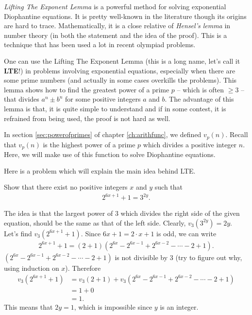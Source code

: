 \documentclass[main.tex]{subfile}
\begin{document}
\textit{Lifting The Exponent Lemma} is a powerful method for solving exponential Diophantine equations. It is pretty well-known in the literature though its origins are hard to trace. Mathematically, it is a close relative of \textit{Hensel's lemma} in number theory (in both the statement and the idea of the proof). This is a technique that has been used a lot in recent olympiad problems.

One can use the Lifting The Exponent Lemma (this is a long name, let's call it \textbf{LTE}!) in problems involving exponential equations, especially when there are some prime numbers (and actually in some cases overkills the problems). This lemma shows how to find the greatest power of a prime $p$ -- which is often $\geq 3$ -- that divides $a^n \pm b^n$ for some positive integers $a$ and $b$. The advantage of this lemma is that, it is quite simple to understand and if in some contest, it is refrained from being used, the proof is not hard as well.


In section \eqref{sec:powerofprimes} of chapter \eqref{ch:arithfunc}, we defined $v_p(n)$. Recall that $v_p(n)$ is the highest power of a prime $p$ which divides a positive integer $n$. Here, we will make use of this function to solve Diophantine equations.

Here is a problem which will explain the main idea behind LTE.

    \begin{problem}
    	Show that there exist no positive integers $x$ and $y$ such that
    	\begin{align*}
    		2^{6x+1} + 1 = 3^{2y}.
    	\end{align*}
    \end{problem}

    \begin{solution}
    	The idea is that the largest power of $3$ which divides the right side of the given equation, should be the same as that of the left side. Clearly, $v_3(3^{2y})=2y$. Let's find $v_3\left(2^{6x+1} + 1\right)$. Since $6x+1= 2 \cdot x +1$ is odd, we can write
    	\begin{align*}
    		2^{6x+1} + 1 = \left(2+1\right) \left(2^{6x} - 2^{6x-1} + 2^{6x-2} - \cdots - 2 + 1\right).
    	\end{align*}
    	$\left(2^{6x} - 2^{6x-1} + 2^{6x-2} - \cdots - 2 + 1\right)$ is not divisible by $3$ (try to figure out why, using induction on $x$). Therefore
    	\begin{align*}
    		v_3\left(2^{6x+1} + 1\right) &= v_3\left(2+1\right) + v_3\left(2^{6x} - 2^{6x-1} + 2^{6x-2} - \cdots - 2 + 1\right)\\
    		& = 1 + 0\\
    		& = 1.
    	\end{align*}
    	This means that $2y=1$, which is impossible since $y$ is an integer.
    \end{solution}
\end{document}
